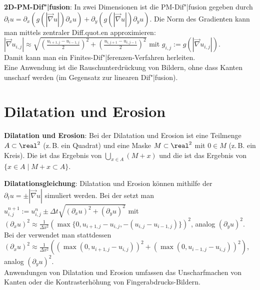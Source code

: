 \linie

\textbf{2D-PM-Dif"|fusion}:
In zwei Dimensionen ist die PM-Dif"|fusion gegeben durch\\
$\partial_t u = \partial_x (g(|\vec{\nabla} u|) \partial_x u) +
\partial_y (g(|\vec{\nabla} u|) \partial_y u)$.
Die Norm des Gradienten kann man mittels zentraler Diff.quot.en approximieren:
$|\vec{\nabla} u_{i,j}| \approx \sqrt{(\frac{u_{i+1,j} - u_{i-1,j}}{2})^2 +
(\frac{u_{i,j+1} - u_{i,j-1}}{2})^2}$ mit $g_{i,j} := g(|\vec{\nabla} u_{i,j}|)$.\\
Damit kann man ein Finites-Dif"|ferenzen-Verfahren herleiten.\\
Eine Anwendung ist die Rauschunterdrückung von Bildern, ohne dass Kanten unscharf werden
(im Gegensatz zur linearen Dif"|fusion).

\section{%
    Dilatation und Erosion%
}

\textbf{Dilatation und Erosion}:
Bei der Dilatation und Erosion ist eine Teilmenge $A \subset \real^2$ (z.\,B. ein Quadrat) und
eine Maske $M \subset \real^2$ mit $0 \in M$ (z.\,B. ein Kreis).
Die  ist das Ergebnis von $\bigcup_{x \in A} (M + x)$ und
die  ist das Ergebnis von $\{x \in A \;|\; M + x \subset A\}$.

\textbf{Dilatationsgleichung}:
Dilatation und Erosion können mithilfe der \\
$\partial_t u = \pm|\vec{\nabla} u|$ simuliert werden.
Bei der  setzt man\\
$u_{i,j}^{n+1} := u_{i,j}^n \pm \Delta t \sqrt{(\partial_x u)^2 + (\partial_y u)^2}$ mit
$(\partial_x u)^2 \approx
\frac{1}{\Delta x^2} (\max\{0, u_{i+1,j} - u_{i,j}, -(u_{i,j} - u_{i-1,j})\})^2$,
analog $(\partial_y u)^2$.\\
Bei der  verwendet man stattdessen\\
$(\partial_x u)^2 \approx
\frac{1}{\Delta x^2} ((\max(0, u_{i+1,j} - u_{i,j}))^2 + (\max(0, u_{i-1,j} - u_{i,j}))^2)$,
analog $(\partial_y u)^2$.\\
Anwendungen von Dilatation und Erosion umfassen das Unscharfmachen von Kanten oder
die Kontrasterhöhung von Fingerabdrucks-Bildern.

\pagebreak
